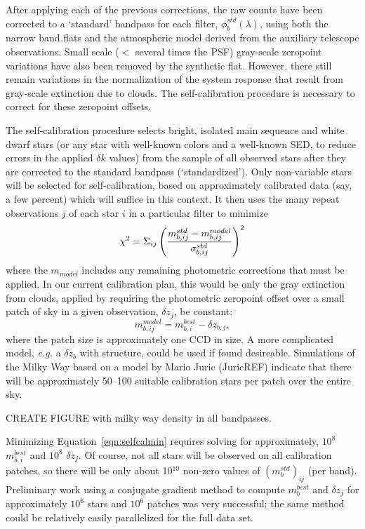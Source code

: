 \documentclass[12pt,preprint]{aastex}
\begin{document}
After applying each of the previous corrections, the raw counts have been
corrected to a `standard' bandpass for each filter,
$\phi_b^{std}(\lambda)$, using both the narrow band flats and the
atmospheric model derived from the auxiliary telescope
observations. Small scale ($<$ several times the PSF) gray-scale
zeropoint variations have also been removed by the synthetic
flat. However, there still remain variations in the normalization of the
system response that result from gray-scale extinction due to
clouds. The self-calibration procedure is necessary to correct for
these zeropoint offsets.

The self-calibration procedure selects bright, isolated main sequence
and white dwarf stars (or any star with well-known colors and a
well-known SED, to reduce errors in the applied
$\delta k$ values) from the sample of all observed stars after they are
corrected to the standard bandpass (`standardized'). Only non-variable stars will be
selected for self-calibration, based on approximately calibrated data
(say, a few percent) which will suffice in this context. It then uses
the many repeat observations $j$ of each star $i$ in a particular filter to minimize
\begin{equation}
\label{eqn:selfcalmin}
\chi^2 = \Sigma_{ij} \left(  { m_{b,ij}^{std} - m_{b,ij}^{model} \over
    \sigma_{b,ij}^{std} } \right)^2
\end{equation}
where the $m_{model}$ includes any remaining photometric corrections
that must be applied. In our current calibration plan, this would be only the
gray extinction from clouds, applied by requiring the photometric
zeropoint offset over a small patch of sky in a given observation, $\delta z_j$, be constant:
\begin{equation}
\label{eqn:zp}
m^{model}_{b,ij} = m^{best}_{b,i} - \delta z_{b,j},
\end{equation}
where the patch size is approximately one CCD in size. A more
complicated model, {\it e.g.} a $\delta z_{b}$ with structure, could
be used if found desireable. Simulations of the Milky Way based on a
model by Mario Juric (JuricREF) indicate that there will be
approximately 50--100 
suitable calibration stars per patch over the entire sky. 

CREATE FIGURE with milky way density in all bandpasses.

Minimizing Equation~\ref{eqn:selfcalmin} requires solving for
approximately, $10^8$ $m_{b,i}^{best}$ and $10^8$ $\delta z_j$. Of
course, not all stars will be observed on all calibration patches, so
there will be only about 10$^{10}$ non-zero values of
$(m_b^{std})_{ij}$ (per band). Preliminary work using a conjugate
gradient method to compute $m_{b}^{best}$ and $\delta z_j$ for
approximately $10^6$ stars and $10^6$ patches was very successful; the
same method could be relatively easily parallelized for the full data
set. 
\end{document}
